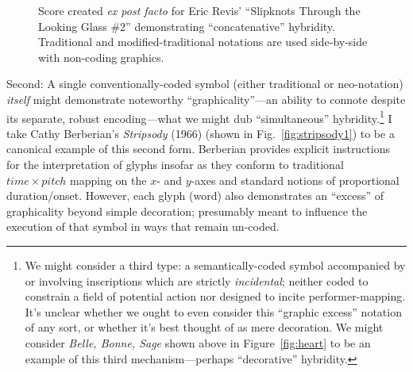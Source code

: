         \begin{figure} 
            \centering
            \captionsetup{width=.5\textwidth}
            \caption[Score created \textit{ex post facto} for Eric Revis' ``Slipknots Through the Looking Glass \#2'' demonstrating ``concatenative'' hybridity. Traditional and modified-traditional notations are used side-by-side with non-coding graphics.]{Score created \textit{ex post facto} for Eric Revis' ``Slipknots Through the Looking Glass \#2'' demonstrating ``concatenative'' hybridity. Traditional and modified-traditional notations are used side-by-side with non-coding graphics.\footnotemark}
            \label{fig:revis}
        \end{figure}

    Second: A single conventionally-coded symbol (either traditional or neo-notation) \textit{itself} might demonstrate noteworthy ``graphicality''---an ability to connote despite its separate, robust encoding---what we might dub ``simultaneous'' hybridity.\footnote{We might consider a third type: a semantically-coded symbol accompanied by or involving inscriptions which are strictly \textit{incidental}; neither coded to constrain a field of potential action nor designed to incite performer-mapping. It's unclear whether we ought to even consider this ``graphic excess'' notation of any sort, or whether it's best thought of as mere decoration. We might consider \textit{Belle, Bonne, Sage} shown above in Figure~\ref{fig:heart} to be an example of this third mechanism---perhaps ``decorative'' hybridity.} I take Cathy Berberian's \textit{Stripsody} (1966) (shown in Fig.~\ref{fig:stripsody1}) to be a canonical example of this second form. Berberian provides explicit instructions for the interpretation of glyphs insofar as they conform to traditional ${time}\times{pitch}$ mapping on the $x$- and $y$-axes and standard notions of proportional duration/onset. However, each glyph (word) also demonstrates an ``excess'' of graphicality beyond simple decoration; presumably meant to influence the execution of that symbol in ways that remain un-coded. 

